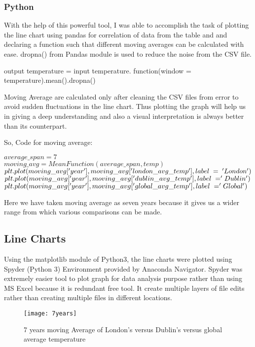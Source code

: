 \documentclass[10pt,journal,compsoc]{IEEEtran}
\begin{document}
\subsubsection{Python}
With the help of this powerful tool, I was able to accomplish the task of plotting the line chart using pandas for correlation of data from the table and and declaring a function such that different moving averages can be calculated with ease. dropna() from Pandas module is used to reduce the noise from the CSV file.

output temperature = input temperature. function(window = temperature).mean().dropna()

Moving Average are calculated only after cleaning the CSV files from error to avoid sudden fluctuations in the line chart. Thus plotting the graph will help us in giving a deep understanding and also a visual interpretation is always better than its counterpart.

So, Code for moving average:

$average\_span = 7$ \\
$moving\_avg = MeanFunction(average\_span, temp)$\\
$plt.plot(moving\_avg['year'],moving\_avg['london\_avg\_temp'], label\hspace{0.1cm}=\hspace{0.1cm}'London')$ \\
$plt.plot(moving\_avg['year'], moving\_avg['dublin\_avg\_temp'], label\hspace{0.1cm}='Dublin')$\\
$plt.plot(moving\_avg['year'], moving\_avg['global\_avg\_temp'], label\hspace{0.1cm}='Global')$

Here we have taken moving average as seven years because it gives us a wider range from which various comparisons can be made.

\subsection{Line Charts}
Using the matplotlib module of Python3, the line charts were plotted using
Spyder (Python 3) Environment provided by Anaconda Navigator. Spyder was extremely easier tool to plot graph for data analysis purpose rather than using MS Excel because it is redundant free tool. It create multiple layers of file edits rather than creating multiple files in different locations.

\begin{figure}[thpb]
      \centering
      \texttt{[image: 7years]}
      \caption{7 years moving Average of London's versus Dublin's versus global average temperature}
      \label{fig: 7 years moving average of London's versus Dublin's versus global average temperature }
\end{figure}
\end{document}
